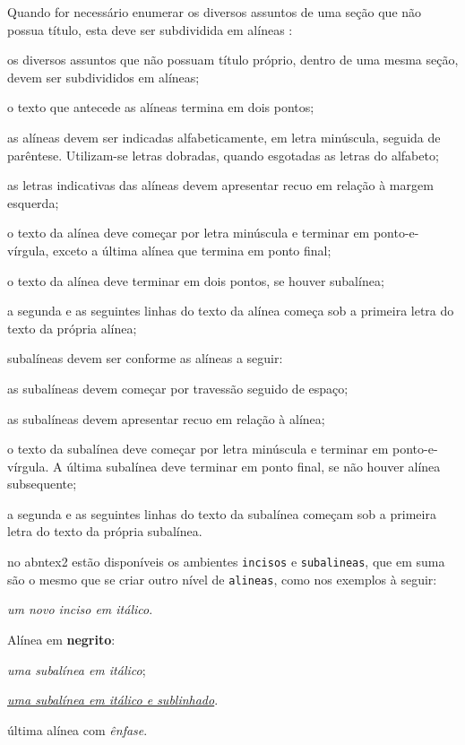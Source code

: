 Quando for necessário enumerar os diversos assuntos de uma seção que não possua título, esta deve ser subdividida em alíneas \cite[subseção 4.2]{NBR6024:2012}:

\begin{alineas}%
\item os diversos assuntos que não possuam título próprio, dentro de uma mesma seção, devem ser subdivididos em alíneas;
\item o texto que antecede as alíneas termina em dois pontos;
\item as alíneas devem ser indicadas alfabeticamente, em letra minúscula, seguida de parêntese. Utilizam-se letras dobradas, quando esgotadas as letras do alfabeto;
\item as letras indicativas das alíneas devem apresentar recuo em relação à margem esquerda;
\item o texto da alínea deve começar por letra minúscula e terminar em ponto-e-vírgula, exceto a última alínea que termina em ponto final;
\item o texto da alínea deve terminar em dois pontos, se houver subalínea;
\item a segunda e as seguintes linhas do texto da alínea começa sob a primeira letra do texto da própria alínea;
\item subalíneas \cite[subseção 4.3]{NBR6024:2012} devem ser conforme as alíneas a seguir:
\begin{alineas}%
\item as subalíneas devem começar por travessão seguido de espaço;
\item as subalíneas devem apresentar recuo em relação à alínea;
\item o texto da subalínea deve começar por letra minúscula e terminar em ponto-e-vírgula. A última subalínea deve terminar em ponto final, se não houver alínea subsequente;
\item a segunda e as seguintes linhas do texto da subalínea começam sob a primeira letra do texto da própria subalínea.
\end{alineas}
\item no \gls{abntex2} estão disponíveis os ambientes \texttt{incisos} e \texttt{subalineas}, que em suma são o mesmo que se criar outro nível de \texttt{alineas}, como nos exemplos à seguir:
\begin{incisos}%
\item \textit{um novo inciso em itálico}.
\end{incisos}
\item Alínea em \textbf{negrito}:
\begin{subalineas}%
\item \textit{uma subalínea em itálico};
\item \underline{\textit{uma subalínea em itálico e sublinhado}}.
\end{subalineas}
\item última alínea com \emph{ênfase}.
\end{alineas}

